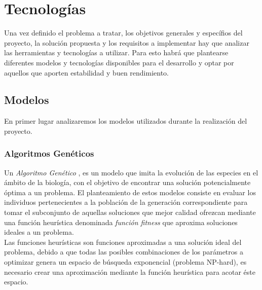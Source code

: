
\chapter{Tecnologías}
\label{3.Tecnologias}

    Una vez definido el problema a tratar, los objetivos generales y específios del proyecto, la solución propuesta y los requisitos a implementar hay que analizar las herramientas y tecnologías a utilizar. Para esto habrá que plantearse diferentes modelos y tecnologías disponibles para el desarrollo y optar por aquellos que aporten estabilidad y buen rendimiento.

    \section{Modelos}

        En primer lugar analizaremos los modelos utilizados durante la realización del proyecto.

        \subsection {Algoritmos Genéticos}
            Un \textit{Algoritmo Genético} \cite{GA}, es un modelo que imita la evolución de las especies en el ámbito de la biología, con el objetivo de encontrar una solución potencialmente óptima a un problema. El planteamiento de estos modelos consiste en evaluar los individuos pertenecientes a la población de la generación correspondiente para tomar el subconjunto de aquellas soluciones que mejor calidad ofrezcan mediante una función heurística denominada \textit{función fitness} que aproxima soluciones ideales a un problema.\\

            Las funciones heurísticas son funciones aproximadas a una solución ideal del problema, debido a que todas las posibles combinaciones de los parámetros a optimizar genera un espacio de búsqueda exponencial (problema NP-hard), es necesario crear una aproximación mediante la función heurística para acotar éste espacio.\\

